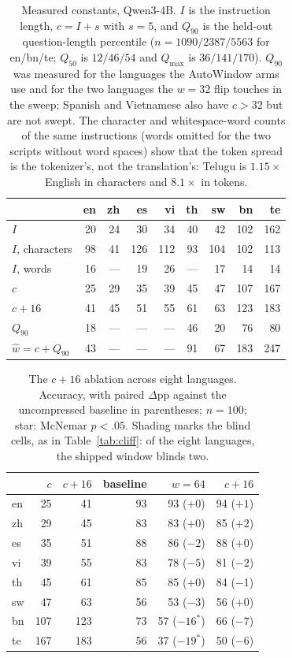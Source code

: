 \documentclass{article}
\newcommand{\blind}[1]{\cellcolor{blindcell}#1}
\begin{document}
\begin{table}[h]
\caption{Measured constants, Qwen3-4B. $I$ is the instruction length,
$c{=}I{+}s$ with $s{=}5$, and $Q_{90}$ is the held-out question-length
percentile ($n{=}1090/2387/5563$ for en/bn/te; $Q_{50}$ is $12/46/54$ and
$Q_{\max}$ is $36/141/170$). $Q_{90}$ was measured for the languages the
AutoWindow arms use and for the two languages the $w{=}32$ flip touches
in the sweep; Spanish and Vietnamese also have $c>32$ but are not swept.
The character and whitespace-word counts of the same instructions (words
omitted for the two scripts without word spaces) show that the token
spread is the tokenizer's, not the translation's: Telugu is $1.15\times$
English in characters and $8.1\times$ in tokens.}
\label{tab:constants}
\centering
\small
\begin{tabular}{lrrrrrrrr}
\toprule
 & en & zh & es & vi & th & sw & bn & te \\
\midrule
$I$ & 20 & 24 & 30 & 34 & 40 & 42 & 102 & 162 \\
$I$, characters & 98 & 41 & 126 & 112 & 93 & 104 & 102 & 113 \\
$I$, words & 16 & --- & 19 & 26 & --- & 17 & 14 & 14 \\
$c$ & 25 & 29 & 35 & 39 & 45 & 47 & 107 & 167 \\
$c{+}16$ & 41 & 45 & 51 & 55 & 61 & 63 & 123 & 183 \\
$Q_{90}$ & 18 & --- & --- & --- & 46 & 20 & 76 & 80 \\
$\hat w = c{+}Q_{90}$ & 43 & --- & --- & --- & 91 & 67 & 183 & 247 \\
\bottomrule
\end{tabular}
\end{table}

\begin{table}[h]
\caption{The $c{+}16$ ablation across eight languages. Accuracy, with
paired $\Delta$pp against the uncompressed baseline in parentheses;
$n{=}100$; star: McNemar $p<.05$. Shading marks the blind cells, as in
Table~\ref{tab:cliff}: of the eight languages, the shipped window blinds
two.}
\label{tab:aw16}
\centering
\small
\begin{tabular}{lrrrrr}
\toprule
 & $c$ & $c{+}16$ & baseline & $w{=}64$ & $c{+}16$ \\
\midrule
en & 25 & 41 & 93 & 93 (${+}0$) & 94 (${+}1$) \\
zh & 29 & 45 & 83 & 83 (${+}0$) & 85 (${+}2$) \\
es & 35 & 51 & 88 & 86 (${-}2$) & 88 (${+}0$) \\
vi & 39 & 55 & 83 & 78 (${-}5$) & 81 (${-}2$) \\
th & 45 & 61 & 85 & 85 (${+}0$) & 84 (${-}1$) \\
sw & 47 & 63 & 56 & 53 (${-}3$) & 56 (${+}0$) \\
bn & 107 & 123 & 73 & \blind{57 (${-}16^{*}$)} & 66 (${-}7$) \\
te & 167 & 183 & 56 & \blind{37 (${-}19^{*}$)} & 50 (${-}6$) \\
\bottomrule
\end{tabular}
\end{table}
\end{document}
